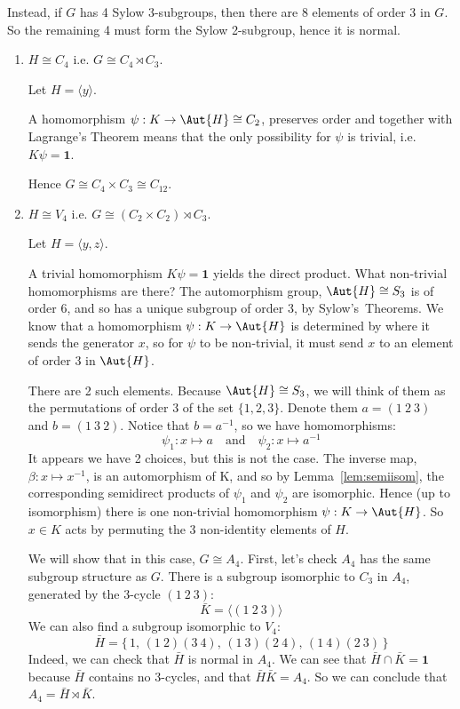 Instead, if \(G\) has 4 Sylow 3-subgroups, then there are 8 elements of order 3 in \(G\).
So the remaining 4 must form the Sylow 2-subgroup, hence it is normal.

\begin{enumerate}
    \item \(H \cong C_4\) i.e. \(G \cong C_4 \rtimes C_3\).

        Let \(H = \langle y \rangle\).

        A homomorphism \(\psi:K \to \Aut{H} \cong C_2\), preserves order and together with Lagrange's Theorem means that
        the only possibility for \(\psi\) is trivial, i.e. \(K\psi = \bm{1}\).

        Hence \(G \cong C_4 \times C_3 \cong C_{12}\).

    \item \(H \cong V_4\) i.e. \(G \cong (C_2 \times C_2) \rtimes C_3\).

        Let \(H = \langle y, z \rangle\).

        A trivial homomorphism \(K\psi = \bm{1}\) yields the direct product.
        What non-trivial homomorphisms are there?
        The automorphism group, \(\Aut{H} \cong S_3\) is of order 6, and so has a unique subgroup of order 3, by
        Sylow's~Theorems.
        We know that a homomorphism \(\psi: K \to \Aut{H}\) is determined by where it sends the generator
        \(x\), so for \(\psi\) to be non-trivial, it must send \(x\) to an element of order 3 in \(\Aut{H}\).

        There are 2 such elements.
        Because \(\Aut{H} \cong S_3\), we will think of them as the permutations of order 3 of the set \(\{1, 2, 3\}\).
        Denote them \(a = (1\ 2\ 3)\) and \(b = (1\ 3\ 2)\).
        Notice that \(b = a^{-1}\), so we have homomorphisms:
        \[\psi_1:x \mapsto a \quad \text{and} \quad \psi_2:x \mapsto a^{-1}\]
        It appears we have 2 choices, but this is not the case.
        The inverse map, \(\beta:x \mapsto x^{-1}\), is an automorphism of K, and so by Lemma~\ref{lem:semiisom}, the
        corresponding semidirect products of \(\psi_1\) and \(\psi_2\) are isomorphic.
        Hence (up to isomorphism) there is one non-trivial homomorphism \(\psi:K \to \Aut{H}\).
        So \(x \in K\) acts by permuting the 3 non-identity elements of \(H\).

        We will show that in this case, \(G \cong A_4\).
        First, let's check \(A_4\) has the same subgroup structure as \(G\).
        There is a subgroup isomorphic to \(C_3\) in \(A_4\), generated by the 3-cycle \((1\ 2\ 3)\):
        \[\bar{K} = \langle (1\ 2\ 3) \rangle\]
        We can also find a subgroup isomorphic to \(V_4\):
        \[\bar{H} = \{\,1,\, (1\ 2)(3\ 4),\, (1\ 3)(2\ 4),\, (1\ 4)(2\ 3)\,\}\]
        Indeed, we can check that \(\bar{H}\) is normal in \(A_4\).
        We can see that \(\bar{H} \cap \bar{K} = \bm{1}\) because \(\bar{H}\) contains no 3-cycles, and that
        \(\bar{H}\bar{K} = A_4\).
        So we can conclude that \(A_4 = \bar{H} \rtimes \bar{K}\).


\end{enumerate}
